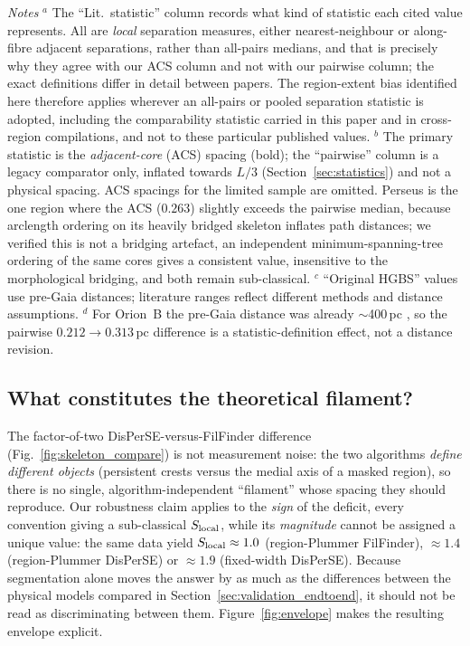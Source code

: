 \documentclass[usenatbib,twoside,twocolumn]{mnras}
\begin{document}
\begin{table}
\vspace{0.1in}
\footnotesize
\emph{Notes} $^{a}$ The ``Lit.\ statistic'' column records what kind of statistic each cited value represents. All are \emph{local} separation measures, either nearest-neighbour or along-fibre adjacent separations, rather than all-pairs medians, and that is precisely why they agree with our ACS column  and not with our pairwise column; the exact definitions differ in detail between papers. The region-extent bias identified here therefore applies wherever an all-pairs or pooled separation statistic is adopted, including the comparability statistic carried in this paper and in cross-region compilations, and not to these particular published values. $^{b}$ The primary statistic is the \emph{adjacent-core} (ACS) spacing (bold); the ``pairwise'' column is a legacy comparator only, inflated towards $L/3$ (Section~\ref{sec:statistics}) and not a physical spacing. ACS spacings for the limited sample are omitted. Perseus is the one region where the ACS ($0.263$) slightly exceeds the pairwise median, because arclength ordering on its heavily bridged skeleton inflates path distances; we verified this is not a bridging artefact, an independent minimum-spanning-tree ordering of the same cores gives a consistent value, insensitive to the morphological bridging, and both remain sub-classical. $^{c}$ ``Original HGBS'' values use pre-Gaia distances; literature ranges reflect different methods and distance assumptions. $^{d}$ For Orion~B the pre-Gaia distance was already $\sim$400\,pc \citep{Konyves2020}, so the pairwise $0.212\to0.313$\,pc difference is a statistic-definition effect, not a distance revision.
\end{table}

\subsection{What constitutes the theoretical filament?}
\label{sec:whatfilament}

The factor-of-two DisPerSE-versus-FilFinder difference (Fig.~\ref{fig:skeleton_compare}) is not measurement noise: the two algorithms \emph{define different objects} (persistent crests versus the medial axis of a masked region), so there is no single, algorithm-independent ``filament'' whose spacing they should reproduce. Our robustness claim applies to the \emph{sign} of the deficit, every convention giving a sub-classical $S_{\rm local}$, while its \emph{magnitude} cannot be assigned a unique value: the same data yield $S_{\rm local}\approx1.0$ (region-Plummer FilFinder), $\approx1.4$ (region-Plummer DisPerSE) or $\approx1.9$ (fixed-width DisPerSE). Because segmentation alone moves the answer by as much as the differences between the physical models compared in Section~\ref{sec:validation_endtoend}, it should not be read as discriminating between them. Figure~\ref{fig:envelope} makes the resulting envelope explicit.
\end{document}
